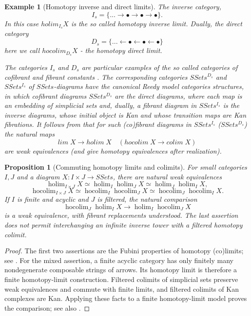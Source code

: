 \documentclass[11pt,a4paper]{article}
\newtheorem{proposition}[theorem]{Proposition}
\newtheorem{example}[theorem]{Example}
\begin{document}
\begin{example}[Homotopy inverse and direct limits]

The inverse category, $$I_s=\{... \rightarrow \bullet\rightarrow\bullet\rightarrow\bullet\}.$$ In this case $holim_{I_s} X$ is the so called homotopy inverse limit.
Dually, the direct category  $$D_s=\{... \leftarrow \bullet\leftarrow\bullet\leftarrow\bullet\}$$ here we call $hocolim_{D_s} X$ - the homotopy direct limit.

The categories $I_s$ and $D_s$ are particular examples of the so called categories of cofibrant and fibrant constants \cite[15.10]{Hir}. 
The corresponding categories  $SSets^{D_s}$ and  $SSets^{I_s}$ of $SSets$-diagrams have the canonical Reedy model categories structures, in which cofibrant diagrams $SSets^{D_s}$ are the direct diagrams, where each map is an embedding of simplicial sets and, dually, a fibrant diagram in $SSets^{I_s}$ is the inverse diagrams, whose initial object is Kan and whose transition maps are Kan fibrations. It follows from \cite[Theorem 19.9.1]{Hir} that for such (co)fibrant diagrams in $SSets^{I_s}$ ($SSets^{D_s}$) the natural maps $$lim \; X\rightarrow holim\; X\quad (hocolim\; X\rightarrow colim\; X)$$
are weak equivalences (and give homotopy equivalences after realization).
\end{example}
\begin{proposition}[Commuting homotopy limits and colimits]\label{hofubini}
For small categories $I,J$ and a diagram $X:I\times J\to SSets$, there
are natural weak equivalences
\[
 \operatorname{holim}_{I\times J}X\simeq
 \operatorname{holim}_I\operatorname{holim}_JX\simeq
 \operatorname{holim}_J\operatorname{holim}_IX,
\]
\[
 \operatorname{hocolim}_{I\times J}X\simeq
 \operatorname{hocolim}_I\operatorname{hocolim}_JX\simeq
 \operatorname{hocolim}_J\operatorname{hocolim}_IX.
\]
If $I$ is finite and acyclic and $J$ is filtered, the natural comparison
\[
 \operatorname{hocolim}_J\operatorname{holim}_IX
 \longrightarrow\operatorname{holim}_I\operatorname{hocolim}_JX
\]
is a weak equivalence, with fibrant replacements understood.  The last
assertion does not permit interchanging an infinite inverse tower with
a filtered homotopy colimit.
\end{proposition}
\begin{proof}
The first two assertions are the Fubini properties of homotopy
(co)limits; see \cite[Section~8.5.5]{MV}.
For the mixed assertion, a finite acyclic
category has only finitely many nondegenerate composable strings of
arrows.  Its homotopy limit is therefore a finite homotopy-limit
construction.  Filtered colimits of simplicial sets preserve weak
equivalences and commute with finite limits, and filtered colimits of
Kan complexes are Kan.  Applying these facts to a finite homotopy-limit
model proves the comparison; see also \cite[Theorem~14.17]{Hir2}.
\end{proof}
\end{document}
